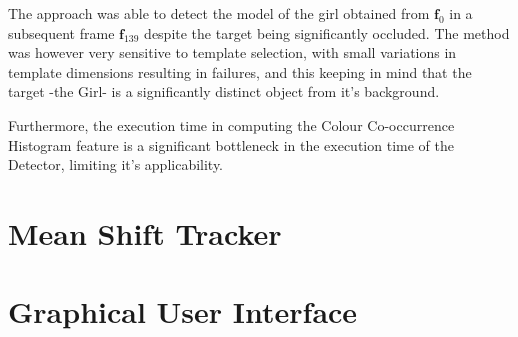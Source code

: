 The approach was able to detect the model of the girl obtained from
$\mathbf{f}_0$ in a subsequent frame $\mathbf{f}_{139}$ despite the target being
significantly occluded. 
The method was however very sensitive to template selection, with small
variations in template dimensions resulting in failures, and this keeping in
mind that the target -the Girl- is a significantly distinct object from it's
background.

Furthermore, the execution time in computing the Colour Co-occurrence Histogram
feature is a significant bottleneck in the execution time of the Detector,
limiting it's applicability.


\section{Mean Shift Tracker}

\section{Graphical User Interface}


